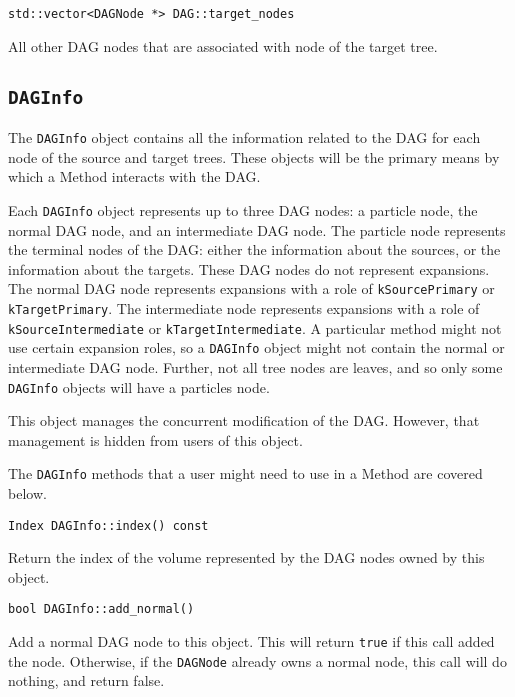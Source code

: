 \begin{lstlisting}
std::vector<DAGNode *> DAG::target_nodes
\end{lstlisting}

\noindent All other DAG nodes that are associated with node of the target tree.



\subsection{\texttt{DAGInfo}}

The \texttt{DAGInfo} object contains all the information related to the DAG
for each node of the source and target trees. These objects will be the
primary means by which a Method interacts with the DAG.

Each \texttt{DAGInfo} object represents up to three DAG nodes: a particle
node, the normal DAG node, and an intermediate DAG node. The particle node
represents the terminal nodes of the DAG: either the information about
the sources, or the information about the targets. These DAG nodes do not
represent expansions. The normal
DAG node represents expansions with a role of \texttt{kSourcePrimary} or
\texttt{kTargetPrimary}. The intermediate node represents expansions with a
role of \texttt{kSourceIntermediate} or \texttt{kTargetIntermediate}. A
particular method might not use certain expansion roles, so a
\texttt{DAGInfo} object might not contain the normal or intermediate DAG node.
Further, not all tree nodes are leaves, and so only some \texttt{DAGInfo}
objects will have a particles node.

This object manages the concurrent modification of the DAG. However, that
management is hidden from users of this object.

The \texttt{DAGInfo} methods that a user might need to use in a Method are
covered below.

\begin{lstlisting}
Index DAGInfo::index() const
\end{lstlisting}

\noindent Return the index of the volume represented by the DAG nodes owned by
this object.

\begin{lstlisting}
bool DAGInfo::add_normal()
\end{lstlisting}

\noindent Add a normal DAG node to this object. This will return \texttt{true}
if this call added the node. Otherwise, if the \texttt{DAGNode} already owns a
normal node, this call will do nothing, and return false.


